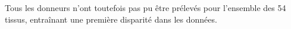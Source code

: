 









Tous les donneurs n'ont toutefois pas pu être prélevés pour l'ensemble des 54 tissus, entraînant une première disparité dans les données.

